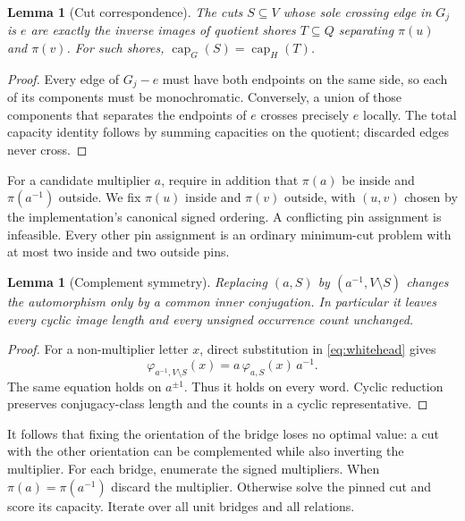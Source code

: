 \documentclass[11pt,letterpaper]{article}
\newtheorem{lemma}[theorem]{Lemma}
\theoremstyle{definition}\newtheorem{definition}[theorem]{Definition}
\newcommand{\capc}{\operatorname{cap}}
\begin{document}
\begin{lemma}[Cut correspondence]\label{lem:quotient}
The cuts $S\subseteq V$ whose sole crossing edge in $G_j$ is $e$ are exactly the inverse images of quotient shores $T\subseteq Q$ separating $\pi(u)$ and $\pi(v)$. For such shores,
$\capc_G(S)=\capc_H(T)$.
\end{lemma}
\begin{proof}
Every edge of $G_j-e$ must have both endpoints on the same side, so each of its components must be monochromatic. Conversely, a union of those components that separates the endpoints of $e$ crosses precisely $e$ locally. The total capacity identity follows by summing capacities on the quotient; discarded edges never cross.
\end{proof}

For a candidate multiplier $a$, require in addition that $\pi(a)$ be inside and $\pi(a^{-1})$ outside. We fix $\pi(u)$ inside and $\pi(v)$ outside, with $(u,v)$ chosen by the implementation's canonical signed ordering. A conflicting pin assignment is infeasible. Every other pin assignment is an ordinary minimum-cut problem with at most two inside and two outside pins.

\begin{lemma}[Complement symmetry]\label{lem:complement}
Replacing $(a,S)$ by $(a^{-1},V\setminus S)$ changes the automorphism only by a common inner conjugation. In particular it leaves every cyclic image length and every unsigned occurrence count unchanged.
\end{lemma}
\begin{proof}
For a non-multiplier letter $x$, direct substitution in \eqref{eq:whitehead} gives
\[
 \varphi_{a^{-1},V\setminus S}(x)=a\,\varphi_{a,S}(x)\,a^{-1}.
\]
The same equation holds on $a^{\pm1}$. Thus it holds on every word. Cyclic reduction preserves conjugacy-class length and the counts in a cyclic representative.
\end{proof}

It follows that fixing the orientation of the bridge loses no optimal value: a cut with the other orientation can be complemented while also inverting the multiplier. For each bridge, enumerate the signed multipliers. When $\pi(a)=\pi(a^{-1})$ discard the multiplier. Otherwise solve the pinned cut and score its capacity. Iterate over all unit bridges and all relations.
\end{document}
